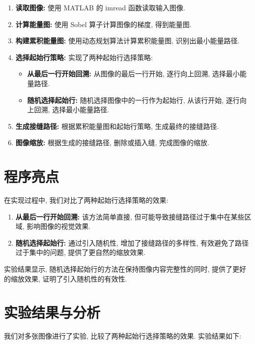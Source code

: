 \documentclass[12pt]{article}
\begin{document}
		\begin{enumerate}
			\item \textbf{读取图像:} 使用 MATLAB 的 imread 函数读取输入图像.
			\item \textbf{计算能量图:} 使用 Sobel 算子计算图像的梯度, 得到能量图.
			\item \textbf{构建累积能量图:} 使用动态规划算法计算累积能量图, 识别出最小能量路径.
			\item \textbf{选择起始行策略:} 实现了两种起始行选择策略:
				\begin{itemize}
					\item \textbf{从最后一行开始回溯:} 从图像的最后一行开始, 逐行向上回溯, 选择最小能量路径.
					\item \textbf{随机选择起始行:} 随机选择图像中的一行作为起始行, 从该行开始, 逐行向上回溯, 选择最小能量路径.
				\end{itemize}
			\item \textbf{生成接缝路径:} 根据累积能量图和起始行策略, 生成最终的接缝路径.
			\item \textbf{图像缩放:} 根据生成的接缝路径, 删除或插入缝, 完成图像的缩放.
		\end{enumerate}

	\section{程序亮点}
		\noindent
		在实现过程中, 我们对比了两种起始行选择策略的效果:

		\begin{enumerate}
			\item \textbf{从最后一行开始回溯:} 该方法简单直接, 但可能导致接缝路径过于集中在某些区域, 影响图像的视觉效果.
			\item \textbf{随机选择起始行:} 通过引入随机性, 增加了接缝路径的多样性, 有效避免了路径过于集中的问题, 提供了更自然的缩放效果.
		\end{enumerate}

		\noindent
		实验结果显示, 随机选择起始行的方法在保持图像内容完整性的同时, 提供了更好的缩放效果, 证明了引入随机性的有效性.

	\section{实验结果与分析}
		\noindent
		我们对多张图像进行了实验, 比较了两种起始行选择策略的效果. 实验结果如下:
\end{document}
